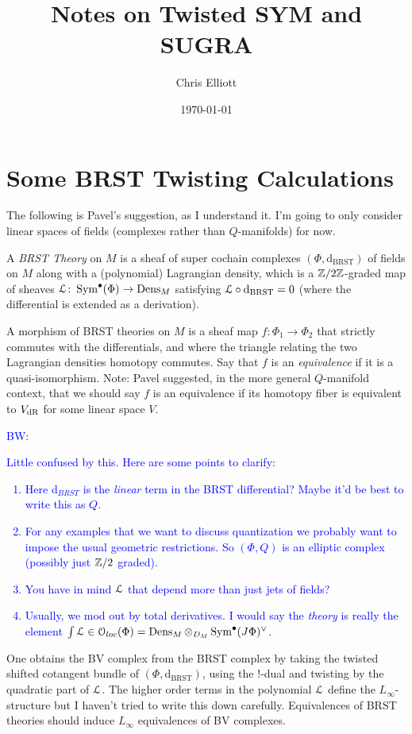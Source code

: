 \documentclass[10pt, oneside]{article}
\title{Notes on Twisted SYM and SUGRA}
\author{Chris Elliott}
\date{\today}
\newcommand{\dBRST}{\mathrm d_{\mathrm{BRST}}}
\renewcommand{\d}{\mathrm{d}}
\def\brian{\textcolor{blue}{BW: }\textcolor{blue}}
\begin{document}
\section{Some BRST Twisting Calculations}
 
The following is Pavel's suggestion, as I understand it.  I'm going to only consider linear spaces of fields (complexes rather than $Q$-manifolds) for now.

\begin{definition}
A \emph{BRST Theory} on $M$ is a sheaf of super cochain complexes $(\Phi, \dBRST)$ of fields on $M$ along with a (polynomial) Lagrangian density, which is a $\mathbb{Z}/2\mathbb{Z}$-graded map of sheaves $\mathcal{L} \colon \operatorname{Sym}^\bullet(\Phi) \to \operatorname{Dens}_M$ satisfying $\LL \circ \dBRST = 0$ (where the differential is extended as a derivation).

A morphism of BRST theories on $M$ is a sheaf map $f \colon \Phi_1 \to \Phi_2$ that strictly commutes with the differentials, and where the triangle relating the two Lagrangian densities homotopy commutes.  Say that $f$ is an \emph{equivalence} if it is a quasi-isomorphism.  Note: Pavel suggested, in the more general $Q$-manifold context, that we should say $f$ is an equivalence if its homotopy fiber is equivalent to $V_{\mathrm{dR}}$ for some linear space $V$.
\end{definition}

\brian{Little confused by this. 
Here are some points to clarify:
\begin{enumerate}
\item Here $\d_{BRST}$ is the {\em linear} term in the BRST differential? 
Maybe it'd be best to write this as $Q$. 
\item For any examples that we want to discuss quantization we probably want to impose the usual geometric restrictions. 
So $(\Phi, Q)$ is an elliptic complex (possibly just $\mathbb{Z}/2$ graded).
\item You have in mind $\mathcal{L}$ that depend more than just jets of fields?
\item Usually, we mod out by total derivatives. 
I would say the {\em theory} is really the element $\int \mathcal{L} \in \mathcal{O}_{loc}(\Phi) = \operatorname{Dens}_M \otimes_{D_M} \operatorname{Sym}^\bullet(J \Phi)^\vee$.
\end{enumerate}
}

\begin{remark}
One obtains the BV complex from the BRST complex by taking the twisted shifted cotangent bundle of $(\Phi, \dBRST)$, using the $!$-dual and twisting by the quadratic part of $\mathcal{L}$.  The higher order terms in the polynomial $\mathcal{L}$ define the $L_\infty$-structure but I haven't tried to write this down carefully.   Equivalences of BRST theories should induce $L_\infty$ equivalences of BV complexes.
\end{remark}
\end{document}
